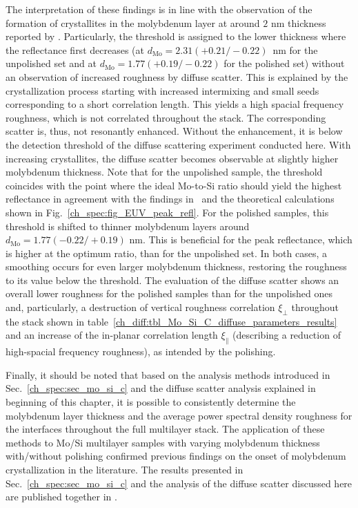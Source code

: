 The interpretation of these findings is in line with the observation of the formation of crystallites in the molybdenum layer at around $2$ nm thickness reported by \textcite{bajt_investigation_2001}. Particularly, the threshold is assigned to the lower thickness where the reflectance first decreases (at $d_\text{Mo}=2.31(+0.21/-0.22)$~nm for the unpolished set and at $d_\text{Mo}=1.77(+0.19/-0.22)$ for the polished set) without an observation of increased roughness by diffuse scatter. This is explained by the crystallization process starting with increased intermixing and small seeds corresponding to a short correlation length. This yields a high spacial frequency roughness, which is not correlated throughout the stack. The corresponding scatter is, thus, not resonantly enhanced. Without the enhancement, it is below the detection threshold of the diffuse scattering experiment conducted here. With increasing crystallites, the diffuse scatter becomes observable at slightly higher molybdenum thickness. Note that for the unpolished sample, the threshold coincides with the point where the ideal Mo-to-Si ratio should yield the highest reflectance in agreement with the findings in~\cite{bajt_investigation_2001} and the theoretical calculations shown in Fig.~\ref{ch_spec:fig_EUV_peak_refl}. For the polished samples, this threshold is shifted to thinner molybdenum layers around $d_\text{Mo} = 1.77(-0.22/+0.19)$ nm. This is beneficial for the peak reflectance, which is higher at the optimum ratio, than for the unpolished set. In both cases, a smoothing occurs for even larger molybdenum thickness, restoring the roughness to its value below the threshold. The evaluation of the diffuse scatter shows an overall lower roughness for the polished samples than for the unpolished ones and, particularly, a destruction of vertical roughness correlation $\xi_\perp$ throughout the stack shown in table~\ref{ch_diff:tbl_Mo_Si_C_diffuse_parameters_results} and an increase of the in-planar correlation length $\xi_\parallel$ (describing a reduction of high-spacial frequency roughness), as intended by the polishing. 

Finally, it should be noted that based on the analysis methods introduced in Sec.~\ref{ch_spec:sec_mo_si_c} and the diffuse scatter analysis explained in beginning of this chapter, it is possible to consistently determine the molybdenum layer thickness and the average power spectral density roughness for the interfaces throughout the full multilayer stack. The application of these methods to Mo/Si multilayer samples with varying molybdenum thickness with/without polishing confirmed previous findings on the onset of molybdenum crystallization in the literature. The results presented in Sec.~\ref{ch_spec:sec_mo_si_c} and the analysis of the diffuse scatter discussed here are published together in .


